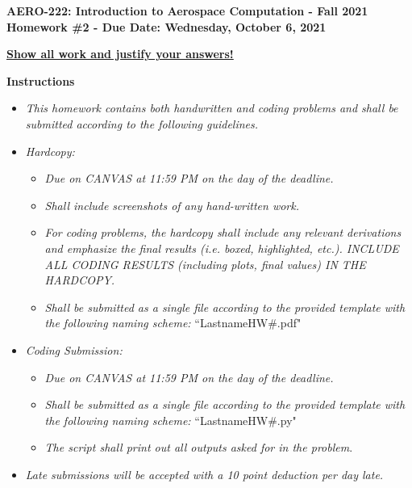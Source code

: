 \documentclass[12pt]{article}
\begin{document}
\newif\ifsolution    %

\solutiontrue

\begin{center}{\bf AERO-222: Introduction to Aerospace Computation - Fall 2021\\ Homework \#2 - Due Date: Wednesday, October 6, 2021} \vspace{0.5cm}

\textbf{\underline{Show all work and justify your answers!}} \vspace{0.5cm}
\end{center}

{\Large \textbf{Instructions}}
\begin{itemize}
	\item \textit{This homework contains both handwritten and coding problems and shall be submitted according to the following guidelines.}
	\item \textit{Hardcopy:}
	\begin{itemize}
	    \item \textit{Due on CANVAS at 11:59 PM on the day of the deadline.}
	    \item \textit{Shall include screenshots of any hand-written work.}
	    \item \textit{For coding problems, the hardcopy shall include any relevant derivations and emphasize the final results (i.e. boxed, highlighted, etc.). INCLUDE ALL CODING RESULTS (including plots, final values) IN THE HARDCOPY.}
	    \item \textit{Shall be submitted as a single file according to the provided template with the following naming scheme:} ``LastnameHW\#.pdf"
	\end{itemize}
	\item \textit{Coding Submission:}
	\begin{itemize}
	    \item \textit{Due on CANVAS at 11:59 PM on the day of the deadline.}
	    \item \textit{Shall be submitted as a single file according to the provided template with the following naming scheme:} ``LastnameHW\#.py"
	    \item \textit{The script shall print out all outputs asked for in the problem}.
	\end{itemize}
    \item \textit{Late submissions will be accepted with a 10 point deduction per day late.}
\end{itemize}
\hrulefill
\end{document}
